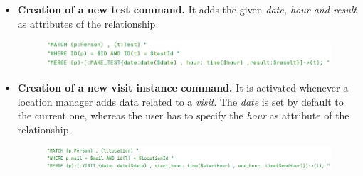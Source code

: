 \begin{itemize}[leftmargin=*]
    \item \textbf{Creation of a new test command.} It adds the given \emph{date, hour and result} as attributes of the relationship.
    \begin{figure}[h]
        \includegraphics[width=\textwidth]{images/commands/add_new_test.png}
    \end{figure}
    \item \textbf{Creation of a new visit instance command.} It is activated whenever a location manager adds data related to a \emph{visit}. The \emph{date} is set by default to the current one, whereas the user has to specify the \emph{hour} as attribute of the relationship.
    \begin{figure}[!h]
        \includegraphics[width = \textwidth]{images/commands/visit_creation.png}
    \end{figure}
\end{itemize}

